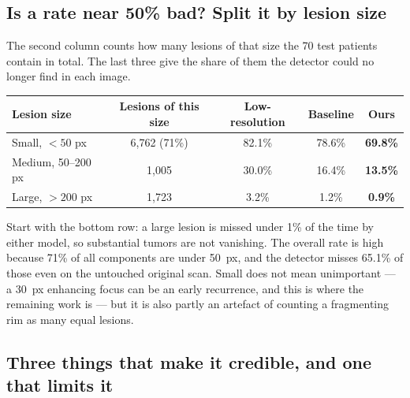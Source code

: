 \documentclass[11pt,a4paper]{article}
\begin{document}
\subsection*{Is a rate near 50\% bad? Split it by lesion size}

The second column counts how many lesions of that size the 70 test patients contain in total.
The last three give the share of them the detector could no longer find in each image.

\begin{center}\small
\renewcommand{\arraystretch}{1.15}
\begin{tabular}{@{}lcccc@{}}
\toprule
\textbf{Lesion size} & \textbf{Lesions of this size} & \textbf{Low-resolution} & \textbf{Baseline} & \textbf{Ours} \\
\midrule
Small, $<50$ px    & 6{,}762 (71\%) & 82.1\% & 78.6\% & \textbf{69.8\%} \\
Medium, 50--200 px & 1{,}005        & 30.0\% & 16.4\% & \textbf{13.5\%} \\
Large, $>200$ px   & 1{,}723        & 3.2\%  & 1.2\%  & \textbf{0.9\%} \\
\bottomrule
\end{tabular}
\end{center}

Start with the bottom row: a large lesion is missed under 1\% of the time by either model, so
substantial tumors are not vanishing. The overall rate is high because 71\% of all components
are under 50~px, and the detector misses 65.1\% of those even on the untouched original scan. Small does not mean unimportant --- a 30~px enhancing focus can be an early
recurrence, and this is where the remaining work is --- but it is also partly an artefact of
counting a fragmenting rim as many equal lesions.

\subsection*{Three things that make it credible, and one that limits it}
\end{document}
